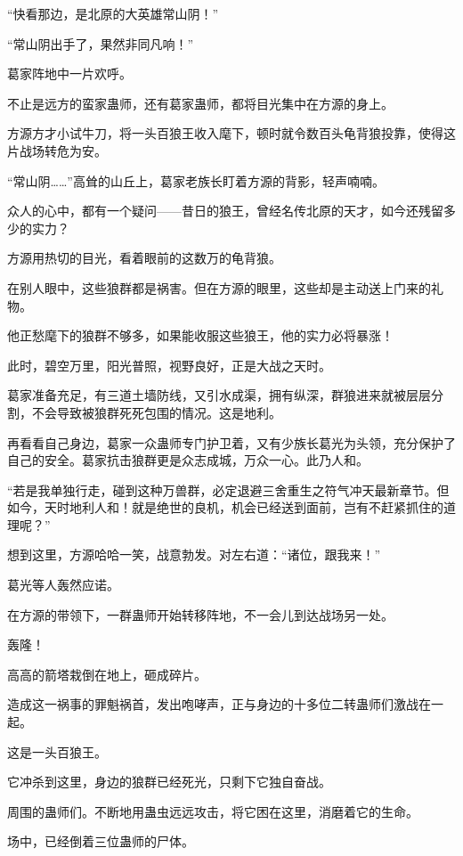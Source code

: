 
\begin{this_body}

“快看那边，是北原的大英雄常山阴！”

“常山阴出手了，果然非同凡响！”

葛家阵地中一片欢呼。

不止是远方的蛮家蛊师，还有葛家蛊师，都将目光集中在方源的身上。

方源方才小试牛刀，将一头百狼王收入麾下，顿时就令数百头龟背狼投靠，使得这片战场转危为安。

“常山阴……”高耸的山丘上，葛家老族长盯着方源的背影，轻声喃喃。

众人的心中，都有一个疑问——昔日的狼王，曾经名传北原的天才，如今还残留多少的实力？

方源用热切的目光，看着眼前的这数万的龟背狼。

在别人眼中，这些狼群都是祸害。但在方源的眼里，这些却是主动送上门来的礼物。

他正愁麾下的狼群不够多，如果能收服这些狼王，他的实力必将暴涨！

此时，碧空万里，阳光普照，视野良好，正是大战之天时。

葛家准备充足，有三道土墙防线，又引水成渠，拥有纵深，群狼进来就被层层分割，不会导致被狼群死死包围的情况。这是地利。

再看看自己身边，葛家一众蛊师专门护卫着，又有少族长葛光为头领，充分保护了自己的安全。葛家抗击狼群更是众志成城，万众一心。此乃人和。

“若是我单独行走，碰到这种万兽群，必定退避三舍重生之符气冲天最新章节。但如今，天时地利人和！就是绝世的良机，机会已经送到面前，岂有不赶紧抓住的道理呢？”

想到这里，方源哈哈一笑，战意勃发。对左右道：“诸位，跟我来！”

葛光等人轰然应诺。

在方源的带领下，一群蛊师开始转移阵地，不一会儿到达战场另一处。

轰隆！

高高的箭塔栽倒在地上，砸成碎片。

造成这一祸事的罪魁祸首，发出咆哮声，正与身边的十多位二转蛊师们激战在一起。

这是一头百狼王。

它冲杀到这里，身边的狼群已经死光，只剩下它独自奋战。

周围的蛊师们。不断地用蛊虫远远攻击，将它困在这里，消磨着它的生命。

场中，已经倒着三位蛊师的尸体。


\end{this_body}
